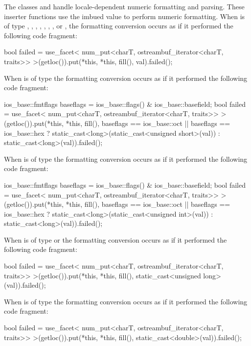 \begin{itemdescr}
\pnum
\effects
The classes
and
handle locale-dependent numeric formatting and
parsing.
These inserter functions use the imbued
value to perform numeric formatting.
When 
is of type
,
,
,
, ,
,
,
or
,
the formatting conversion occurs as if it performed the following code fragment:
\begin{codeblock}
bool failed = use_facet<
  num_put<charT, ostreambuf_iterator<charT, traits>>
    >(getloc()).put(*this, *this, fill(), val).failed();
\end{codeblock}

When  is of type
the formatting conversion occurs as if it performed the following code fragment:
\begin{codeblock}
ios_base::fmtflags baseflags = ios_base::flags() & ios_base::basefield;
bool failed = use_facet<
  num_put<charT, ostreambuf_iterator<charT, traits>>
    >(getloc()).put(*this, *this, fill(),
    baseflags == ios_base::oct || baseflags == ios_base::hex
      ? static_cast<long>(static_cast<unsigned short>(val))
      : static_cast<long>(val)).failed();
\end{codeblock}

When  is of type
the formatting conversion occurs as if it performed the following code fragment:
\begin{codeblock}
ios_base::fmtflags baseflags = ios_base::flags() & ios_base::basefield;
bool failed = use_facet<
  num_put<charT, ostreambuf_iterator<charT, traits>>
    >(getloc()).put(*this, *this, fill(),
    baseflags == ios_base::oct || baseflags == ios_base::hex
      ? static_cast<long>(static_cast<unsigned int>(val))
      : static_cast<long>(val)).failed();
\end{codeblock}

When  is of type
or
the formatting conversion occurs as if it performed the following code fragment:
\begin{codeblock}
bool failed = use_facet<
  num_put<charT, ostreambuf_iterator<charT, traits>>
    >(getloc()).put(*this, *this, fill(),
      static_cast<unsigned long>(val)).failed();
\end{codeblock}

When  is of type
the formatting conversion occurs as if it performed the following code fragment:
\begin{codeblock}
bool failed = use_facet<
  num_put<charT, ostreambuf_iterator<charT, traits>>
    >(getloc()).put(*this, *this, fill(),
      static_cast<double>(val)).failed();
\end{codeblock}


\end{itemdescr}
